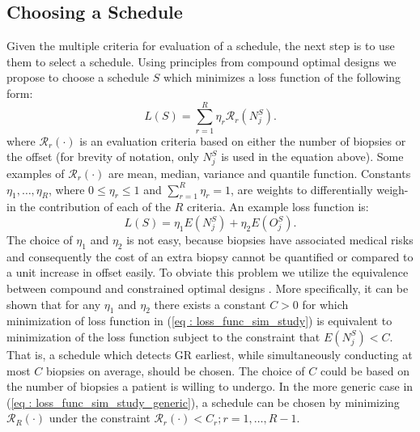 \subsection{Choosing a Schedule}
\label{subsec : optimal_schedule}
Given the multiple criteria for evaluation of a schedule, the next step is to use them to select a schedule. Using principles from compound optimal designs \citep{lauter1976optimal} we propose to choose a schedule $S$ which minimizes a loss function of the following form:
\begin{equation}
\label{eq : loss_func_sim_study_generic}
L(S) = \sum_{r=1}^R \eta_r \mathcal{R}_r(N^S_j).
\end{equation}
where $\mathcal{R}_r(\cdot)$ is an evaluation criteria based on either the number of biopsies or the offset (for brevity of notation, only $N^S_j$ is used in the equation above). Some examples of $\mathcal{R}_r(\cdot)$ are mean, median, variance and quantile function. Constants $\eta_1, \ldots, \eta_R$, where $0 \leq \eta_r \leq 1$ and $\sum_{r=1}^R \eta_r = 1$, are weights to differentially weigh-in the contribution of each of the $R$ criteria. An example loss function is:
\begin{equation}
\label{eq : loss_func_sim_study}
L(S) = \eta_1 E(N^S_j) + \eta_2 E(O^S_j). 
\end{equation}
The choice of $\eta_1$ and $\eta_2$ is not easy, because biopsies have associated medical risks and consequently the cost of an extra biopsy cannot be quantified or compared to a unit increase in offset easily. To obviate this problem we utilize the equivalence between compound and constrained optimal designs \citep{cook1994equivalence}. More specifically, it can be shown that for any $\eta_1$ and $\eta_2$ there exists a constant $C>0$ for which minimization of loss function in (\ref{eq : loss_func_sim_study}) is equivalent to minimization of the loss function subject to the constraint that $E(N^S_j) < C$. That is, a schedule which detects GR earliest, while simultaneously conducting at most $C$ biopsies on average, should be chosen. The choice of $C$ could be based on the number of biopsies a patient is willing to undergo. In the more generic case in (\ref{eq : loss_func_sim_study_generic}), a schedule can be chosen by minimizing $\mathcal{R}_R(\cdot)$ under the constraint $\mathcal{R}_r(\cdot) < C_r; r=1, \ldots, R-1$.